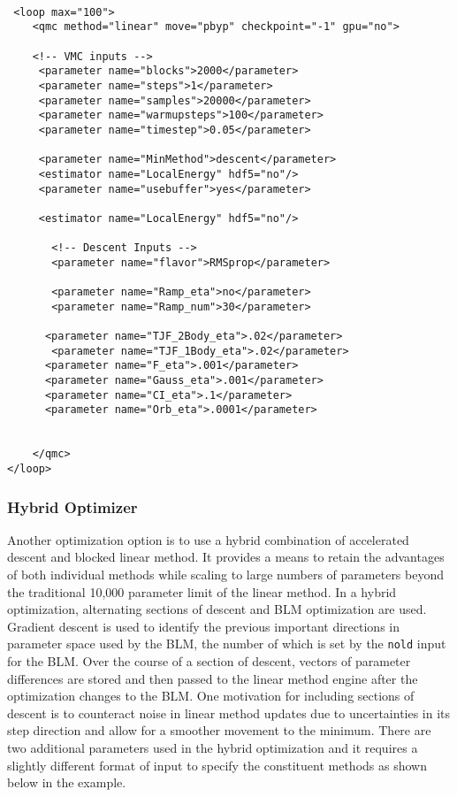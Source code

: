 \begin{lstlisting}[style=QMCPXML]
 
 <loop max="100">
    <qmc method="linear" move="pbyp" checkpoint="-1" gpu="no">
    
    <!-- VMC inputs -->
     <parameter name="blocks">2000</parameter>
     <parameter name="steps">1</parameter>
     <parameter name="samples">20000</parameter>
     <parameter name="warmupsteps">100</parameter>
     <parameter name="timestep">0.05</parameter>

     <parameter name="MinMethod">descent</parameter>
     <estimator name="LocalEnergy" hdf5="no"/>
     <parameter name="usebuffer">yes</parameter>

     <estimator name="LocalEnergy" hdf5="no"/>
           
	   <!-- Descent Inputs -->
       <parameter name="flavor">RMSprop</parameter>

       <parameter name="Ramp_eta">no</parameter>
       <parameter name="Ramp_num">30</parameter>
           
      <parameter name="TJF_2Body_eta">.02</parameter>
       <parameter name="TJF_1Body_eta">.02</parameter>
      <parameter name="F_eta">.001</parameter>
      <parameter name="Gauss_eta">.001</parameter>
      <parameter name="CI_eta">.1</parameter>
      <parameter name="Orb_eta">.0001</parameter>


    </qmc>
</loop> 
 \end{lstlisting}


\subsubsection{Hybrid Optimizer}

Another optimization option is to use a hybrid combination of accelerated descent and blocked linear method.
It provides a means to retain the advantages of both individual methods while scaling to large numbers of parameters beyond the traditional 10,000 parameter limit of the linear method.\cite{Otis2019}
In a hybrid optimization, alternating sections of descent and BLM optimization are used.
Gradient descent is used to identify the previous important directions in parameter space used by the BLM, the number of which is set by the \texttt{nold} input for the BLM.
Over the course of a section of descent, vectors of parameter differences are stored and then passed to the linear method engine after the optimization changes to the BLM.
One motivation for including sections of descent is to counteract noise in linear method updates due to uncertainties in its step direction and allow for a smoother movement to the minimum.
There are two additional parameters used in the hybrid optimization and it requires a slightly different format of input to specify the constituent methods as shown below in the example.

